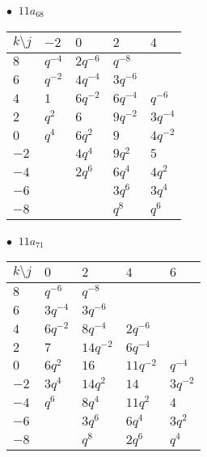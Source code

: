 \begin{minipage}{\linewidth}
$\bullet\ $ $11a_{68}$ \vspace{0.5em} \\
\begin{tabular}{l|llll}
$k \setminus j$ & $-2$ & $0$ & $2$ & $4$ \\
\hline
$8$ & $q^{-4}$ & $2q^{-6}$ & $q^{-8}$ &  \\
$6$ & $q^{-2}$ & $4q^{-4}$ & $3q^{-6}$ &  \\
$4$ & $1$ & $6q^{-2}$ & $6q^{-4}$ & $q^{-6}$ \\
$2$ & $q^{2}$ & $6$ & $9q^{-2}$ & $3q^{-4}$ \\
$0$ & $q^{4}$ & $6q^{2}$ & $9$ & $4q^{-2}$ \\
$-2$ &  & $4q^{4}$ & $9q^{2}$ & $5$ \\
$-4$ &  & $2q^{6}$ & $6q^{4}$ & $4q^{2}$ \\
$-6$ &  &  & $3q^{6}$ & $3q^{4}$ \\
$-8$ &  &  & $q^{8}$ & $q^{6}$ \\
\end{tabular}
\vspace{2em}
\end{minipage}
%
\begin{minipage}{\linewidth}
$\bullet\ $ $11a_{71}$ \vspace{0.5em} \\
\begin{tabular}{l|llll}
$k \setminus j$ & $0$ & $2$ & $4$ & $6$ \\
\hline
$8$ & $q^{-6}$ & $q^{-8}$ &  &  \\
$6$ & $3q^{-4}$ & $3q^{-6}$ &  &  \\
$4$ & $6q^{-2}$ & $8q^{-4}$ & $2q^{-6}$ &  \\
$2$ & $7$ & $14q^{-2}$ & $6q^{-4}$ &  \\
$0$ & $6q^{2}$ & $16$ & $11q^{-2}$ & $q^{-4}$ \\
$-2$ & $3q^{4}$ & $14q^{2}$ & $14$ & $3q^{-2}$ \\
$-4$ & $q^{6}$ & $8q^{4}$ & $11q^{2}$ & $4$ \\
$-6$ &  & $3q^{6}$ & $6q^{4}$ & $3q^{2}$ \\
$-8$ &  & $q^{8}$ & $2q^{6}$ & $q^{4}$ \\
\end{tabular}
\vspace{2em}
\end{minipage}
%
